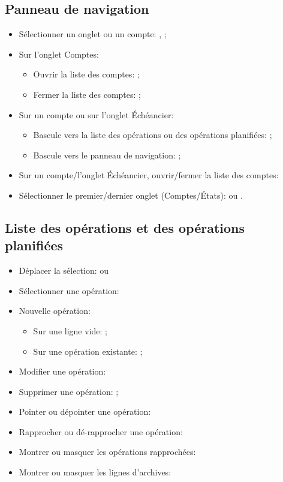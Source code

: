 \subsection{Panneau de navigation}

\begin{itemize}
	\item Sélectionner un onglet ou un compte: , ;
	\item Sur l'onglet Comptes:
		\begin{itemize}
			\item Ouvrir la liste des comptes: ;
			\item Fermer la liste des comptes:  ;
		\end{itemize}
	\item Sur un compte ou sur l'onglet Échéancier:
		\begin{itemize}
			\item Bascule vers la liste des opérations ou des opérations planifiées: ;
			\item Bascule vers le panneau de navigation: ;
		\end{itemize}
	\item Sur un compte/l'onglet Échéancier, ouvrir/fermer la liste des comptes:
	\item Sélectionner le premier/dernier onglet (Comptes/États):  ou .
\end{itemize}


\subsection{Liste des opérations et des opérations planifiées}

\begin{itemize}
	\item Déplacer la sélection:  ou 
	\item Sélectionner une opération: 
	\item Nouvelle opération:
		\begin{itemize}
			\item Sur une ligne vide: ;
			\item Sur une opération existante: ;
		\end{itemize}
	\item Modifier une opération: 
	\item Supprimer une opération: ;
	\item Pointer ou dépointer une opération: 
	\item Rapprocher ou dé-rapprocher une opération: 
	\item Montrer ou masquer les opérations rapprochées: 
	\item Montrer ou masquer les lignes d'archives: 
\end{itemize}


